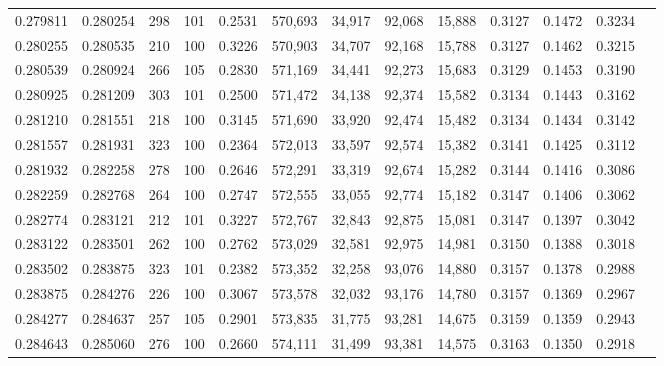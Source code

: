 \begin{tabular}{rrrrrrrrrrrrr}
0.279811 & 0.280254 &   298 & 101 &                                     0.2531 & 570,693 &  34,917 &  92,068 &  15,888 & 0.3127 & 0.1472 & 0.3234 \\
0.280255 & 0.280535 &   210 & 100 &                                     0.3226 & 570,903 &  34,707 &  92,168 &  15,788 & 0.3127 & 0.1462 & 0.3215 \\
0.280539 & 0.280924 &   266 & 105 &                                     0.2830 & 571,169 &  34,441 &  92,273 &  15,683 & 0.3129 & 0.1453 & 0.3190 \\
0.280925 & 0.281209 &   303 & 101 &                                     0.2500 & 571,472 &  34,138 &  92,374 &  15,582 & 0.3134 & 0.1443 & 0.3162 \\
0.281210 & 0.281551 &   218 & 100 &                                     0.3145 & 571,690 &  33,920 &  92,474 &  15,482 & 0.3134 & 0.1434 & 0.3142 \\
0.281557 & 0.281931 &   323 & 100 &                                     0.2364 & 572,013 &  33,597 &  92,574 &  15,382 & 0.3141 & 0.1425 & 0.3112 \\
0.281932 & 0.282258 &   278 & 100 &                                     0.2646 & 572,291 &  33,319 &  92,674 &  15,282 & 0.3144 & 0.1416 & 0.3086 \\
0.282259 & 0.282768 &   264 & 100 &                                     0.2747 & 572,555 &  33,055 &  92,774 &  15,182 & 0.3147 & 0.1406 & 0.3062 \\
0.282774 & 0.283121 &   212 & 101 &                                     0.3227 & 572,767 &  32,843 &  92,875 &  15,081 & 0.3147 & 0.1397 & 0.3042 \\
0.283122 & 0.283501 &   262 & 100 &                                     0.2762 & 573,029 &  32,581 &  92,975 &  14,981 & 0.3150 & 0.1388 & 0.3018 \\
0.283502 & 0.283875 &   323 & 101 &                                     0.2382 & 573,352 &  32,258 &  93,076 &  14,880 & 0.3157 & 0.1378 & 0.2988 \\
0.283875 & 0.284276 &   226 & 100 &                                     0.3067 & 573,578 &  32,032 &  93,176 &  14,780 & 0.3157 & 0.1369 & 0.2967 \\
0.284277 & 0.284637 &   257 & 105 &                                     0.2901 & 573,835 &  31,775 &  93,281 &  14,675 & 0.3159 & 0.1359 & 0.2943 \\
0.284643 & 0.285060 &   276 & 100 &                                     0.2660 & 574,111 &  31,499 &  93,381 &  14,575 & 0.3163 & 0.1350 & 0.2918 \\

\end{tabular}
